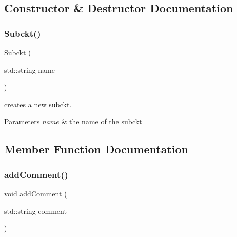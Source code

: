 \subsection{Constructor \& Destructor Documentation}
\mbox{\label{class_s_p_i_c_e_1_1_subckt_a5b9ee31a0302af435029f29a93b29d7d}} 
\subsubsection{\texorpdfstring{Subckt()}{Subckt()}}
{\footnotesize\ttfamily \hyperlink{class_s_p_i_c_e_1_1_subckt}{Subckt} (\begin{DoxyParamCaption}\item[{std\+::string}]{name }\end{DoxyParamCaption})\hspace{0.3cm}{\ttfamily [inline]}}



creates a new subckt. 


\begin{DoxyParams}{Parameters}
{\em name} & the name of the subckt \\
\hline
\end{DoxyParams}


\subsection{Member Function Documentation}
\mbox{\label{class_s_p_i_c_e_1_1_subckt_a6c590c1d92248d6e5f95ea6c470fbb5a}} 
\subsubsection{\texorpdfstring{add\+Comment()}{addComment()}}
{\footnotesize\ttfamily void add\+Comment (\begin{DoxyParamCaption}\item[{std\+::string}]{comment }\end{DoxyParamCaption})\hspace{0.3cm}{\ttfamily [inline]}}




